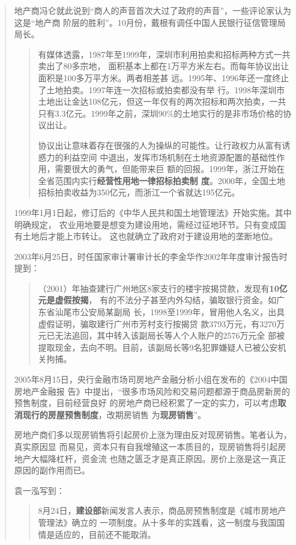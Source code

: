 \begin{quotation}
地产商冯仑就此说到“商人的声音首次大过了政府的声音”，一些评论家认为这是“地产商
阶层的胜利”。10月份，戴根有调任中国人民银行征信管理局局长。

\begin{quotation}
  有媒体透露，1987年至1999年，深圳市利用拍卖和招标两种方式一共卖出了80多宗地，
  面积基本上都在1万平方米左右。而每年协议出让面积是100多万平方米。两者相差甚
  远。1995年、1996年还一度终止了土地拍卖。1997年连一次招标或拍卖都没有举
  行。1998年深圳市土地出让金达108亿元，但这一年仅有的两次招标和两次拍卖，一共
  只有3.3亿元。1999年之前，深圳90\%的土地实行的是非市场价格的协议出让。

  协议出让意味着存在很强的人为操纵的可能性。让行政权力从富有诱惑力的利益空间
  中退出，发挥市场机制在土地资源配置的基础性作用，需要很大的勇气，但能带来巨
  额的回报。1999年，浙江开始在全省范围内实行\textbf{经营性用地一律招标拍卖制
    度}。2000年，全国土地招标拍卖收益为350亿元，而浙江一个省就达195亿元。
\end{quotation}

1999年1月1日起，修订后的《中华人民共和国土地管理法》开始实施。其中明确规定，
农业用地要是想变为建设用地，需经过征地环节。只有变成国有土地后才能上市转让。
这也就确立了政府对于建设用地的垄断地位。

2003年6月25日，时任国家审计署审计长的李金华作2002年年度审计报告时提到：
\begin{quotation}
  （2001）年抽查建行广州地区8家支行的楼宇按揭贷款，发现有\textbf{10亿元是虚假按揭}，
  有的不法分子甚至内外勾结，骗取银行资金。如广东省汕尾市公安局某副局
  长，1998至1999年，冒用他人名义，出具虚假证明，骗取建行广州市芳村支行按揭贷
  款3793万元，有3270万元已无法追回，其中转入该副局长等人个人账户的2576万元全
  部被提取现金，去向不明。目前，该副局长等9名犯罪嫌疑人已被公安机关拘捕。
\end{quotation}

2005年8月15日，央行金融市场司房地产金融分析小组在发布的《2004中国房地产金融报
告》中提出，“很多市场风险和交易问题都源于商品房新房的预售制度，目前经营良好
的房地产商已经积累了一定的实力，可以考虑\textbf{取消现行的房屋预售制度}，改期房销售
为\textbf{现房销售}”。

房地产商们多以现房销售将引起房价上涨为理由反对现房销售。笔者认为，真实原因显
而易见，资本只有自我增殖这一本质目的，现房销售将引起房地产大幅降杠杆，资金流
也随之匮乏才是真正原因。房价上涨是这一真正原因的副作用而已。

袁一泓写到：
\begin{quotation}
  8月24日，\textbf{建设部}新闻发言人表示，商品房预售制度是《城市房地产管理法》确立的
  一项制度。从十多年的实践看，这一制度与我国国情是适应的，目前还不能取消。


\end{quotation}
\end{quotation}
